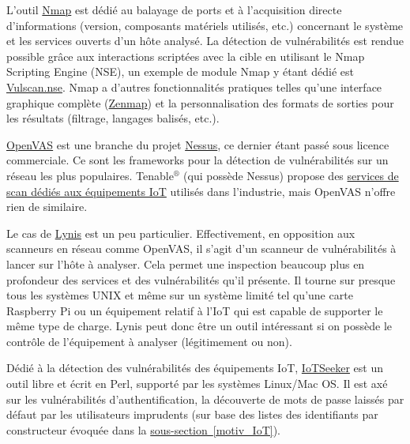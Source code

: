\documentclass[]{article}
\newcommand{\wordlink}[2]{\hyperref[#1]{#2~\ref{#1}}}
\begin{document}
\par L'outil \href{https://nmap.org/}{Nmap} est dédié au balayage de ports et à l'acquisition directe d'informations (version, composants matériels utilisés, etc.) concernant le système et les services ouverts d'un hôte analysé. La détection de vulnérabilités est rendue possible grâce aux interactions scriptées avec la cible en utilisant le Nmap Scripting Engine (NSE), un exemple de module Nmap y étant dédié est \href{https://www.computec.ch/projekte/vulscan/}{Vulscan.nse}. Nmap a d'autres fonctionnalités pratiques telles qu'une interface graphique complète (\href{https://nmap.org/zenmap/}{Zenmap}) et la personnalisation des formats de sorties pour les résultats (filtrage, langages balisés, etc.).\\

\par \href{http://www.openvas.org/}{OpenVAS} est une branche du projet \href{https://www.tenable.com/products/nessus/nessus-professional}{Nessus}, ce dernier étant passé sous licence commerciale. Ce sont les frameworks pour la détection de vulnérabilités sur un réseau les plus populaires. Tenable$^{®}$ (qui possède Nessus) propose des \href{https://www.tenable.com/solutions/iot}{services de scan dédiés aux équipements IoT} utilisés dans l'industrie, mais OpenVAS n'offre rien de similaire.\\

\par Le cas de \href{https://cisofy.com/lynis/}{Lynis} est un peu particulier. Effectivement, en opposition aux scanneurs en réseau comme OpenVAS, il s'agit d'un scanneur de vulnérabilités à lancer sur l'hôte à analyser. Cela permet une inspection beaucoup plus en profondeur des services et des vulnérabilités qu'il présente. Il tourne sur presque tous les systèmes UNIX et même sur un système limité tel qu'une carte Raspberry Pi ou un équipement relatif à l'IoT qui est capable de supporter le même type de charge. Lynis peut donc être un outil intéressant si on possède le contrôle de l'équipement à analyser (légitimement ou non).\\

\par Dédié à la détection des vulnérabilités des équipements IoT, \href{https://github.com/rapid7/IoTSeeker}{IoTSeeker} est un outil libre et écrit en Perl, supporté par les systèmes Linux/Mac OS. Il est axé sur les vulnérabilités d'authentification, la découverte de mots de passe laissés par défaut par les utilisateurs imprudents (sur base des listes des identifiants par constructeur évoquée dans la \wordlink{motiv_IoT}{sous-section}).\\
\end{document}
